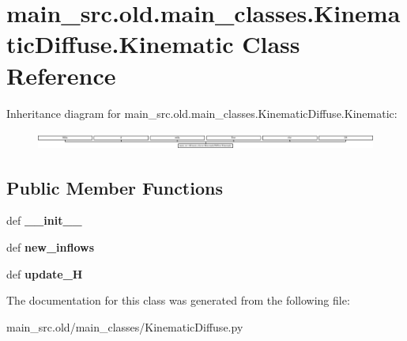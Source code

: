 \hypertarget{classmain__src_8old_1_1main__classes_1_1KinematicDiffuse_1_1Kinematic}{\section{main\-\_\-src.\-old.\-main\-\_\-classes.\-Kinematic\-Diffuse.\-Kinematic Class Reference}
\label{classmain__src_8old_1_1main__classes_1_1KinematicDiffuse_1_1Kinematic}
}
Inheritance diagram for main\-\_\-src.\-old.\-main\-\_\-classes.\-Kinematic\-Diffuse.\-Kinematic\-:\begin{figure}[H]
\begin{center}
\leavevmode
\includegraphics[height=0.570846cm]{classmain__src_8old_1_1main__classes_1_1KinematicDiffuse_1_1Kinematic}
\end{center}
\end{figure}
\subsection*{Public Member Functions}
\begin{DoxyCompactItemize}
\item 
\hypertarget{classmain__src_8old_1_1main__classes_1_1KinematicDiffuse_1_1Kinematic_a8745a708bd285df4ce6f095ab035fa84}{def {\bfseries \-\_\-\-\_\-init\-\_\-\-\_\-}}\label{classmain__src_8old_1_1main__classes_1_1KinematicDiffuse_1_1Kinematic_a8745a708bd285df4ce6f095ab035fa84}

\item 
\hypertarget{classmain__src_8old_1_1main__classes_1_1KinematicDiffuse_1_1Kinematic_adcf54af04a17fd49ff80a49dff7657e8}{def {\bfseries new\-\_\-inflows}}\label{classmain__src_8old_1_1main__classes_1_1KinematicDiffuse_1_1Kinematic_adcf54af04a17fd49ff80a49dff7657e8}

\item 
\hypertarget{classmain__src_8old_1_1main__classes_1_1KinematicDiffuse_1_1Kinematic_a929932d9f3b0adcdf2bfd7a06d711bea}{def {\bfseries update\-\_\-\-H}}\label{classmain__src_8old_1_1main__classes_1_1KinematicDiffuse_1_1Kinematic_a929932d9f3b0adcdf2bfd7a06d711bea}

\end{DoxyCompactItemize}


The documentation for this class was generated from the following file\-:\begin{DoxyCompactItemize}
\item 
main\-\_\-src.\-old/main\-\_\-classes/Kinematic\-Diffuse.\-py\end{DoxyCompactItemize}
